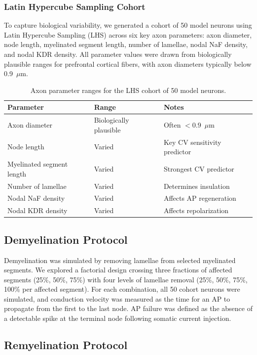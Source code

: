 \documentclass[11pt]{article}
\begin{document}
\subsubsection{Latin Hypercube Sampling Cohort}

To capture biological variability, we generated a cohort of 50 model neurons using Latin Hypercube Sampling (LHS) across six key axon parameters: axon diameter, node length, myelinated segment length, number of lamellae, nodal NaF density, and nodal KDR density. All parameter values were drawn from biologically plausible ranges for prefrontal cortical fibers, with axon diameters typically below 0.9~$\mu$m.

\begin{table}[ht]
\centering
\caption{Axon parameter ranges for the LHS cohort of 50 model neurons.}
\label{tab:lhs_params}
\begin{tabular}{lll}
\toprule
Parameter & Range & Notes \\
\midrule
Axon diameter & Biologically plausible & Often $<0.9$~$\mu$m \\
Node length & Varied & Key CV sensitivity predictor \\
Myelinated segment length & Varied & Strongest CV predictor \\
Number of lamellae & Varied & Determines insulation \\
Nodal NaF density & Varied & Affects AP regeneration \\
Nodal KDR density & Varied & Affects repolarization \\
\bottomrule
\end{tabular}
\end{table}

\subsection{Demyelination Protocol}

Demyelination was simulated by removing lamellae from selected myelinated segments. We explored a factorial design crossing three fractions of affected segments (25\%, 50\%, 75\%) with four levels of lamellae removal (25\%, 50\%, 75\%, 100\% per affected segment). For each combination, all 50 cohort neurons were simulated, and conduction velocity was measured as the time for an AP to propagate from the first to the last node. AP failure was defined as the absence of a detectable spike at the terminal node following somatic current injection.

\subsection{Remyelination Protocol}
\end{document}
